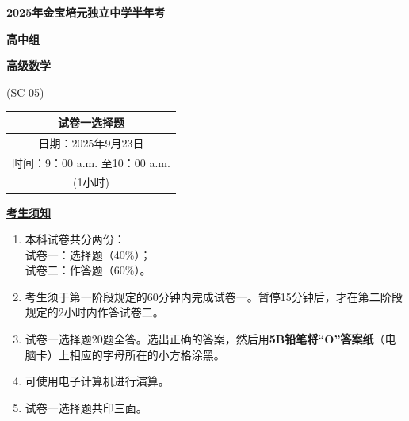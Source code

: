\documentclass[12pt,a4paper]{exam-zh}
\newcommand{\papercode}{SC 05}
\begin{document}
\thispagestyle{fancy}

\begin{minipage}[t]{0.22\linewidth}
  \vspace{0pt}
\end{minipage}
\hfill
\begin{minipage}[t]{0.56\linewidth}
  \centering
  {\bfseries 2025年金宝培元独立中学半年考\par}
  \vspace{2.3em}
  {\bfseries 高中组\par}
  \vspace{0.3em}
  {\bfseries 高级数学\par}
  \vspace{0.2em}
  {\large (\papercode)\par}
\end{minipage}
\hfill
\begin{minipage}[t]{0.18\linewidth}
  \vspace{0pt}
\end{minipage}

\vspace{3.0em}

\begin{center}
  \begin{tabular}{c}
    试卷一\hspace{2em}选择题\\[-0.1em]
    \midrule
    日期：2025年9月23日\\[-0.1em]
    时间：9：00 a.m. 至10：00 a.m.\\[-0.1em]
    (1小时)\\
    \midrule
  \end{tabular}
\end{center}

\vspace{2.0em}

{\bfseries \underline{考生须知}\par}
\vspace{0.8em}

\begin{enumerate}[label=\arabic*、,leftmargin=2em,itemsep=0.65em]
  \item 本科试卷共分两份：\\
  试卷一：选择题（40\%）；\\
  试卷二：作答题（60\%）。

  \item 考生须于第一阶段规定的60分钟内完成试卷一。暂停15分钟后，才在第二阶段规定的2小时内作答试卷二。

  \item 试卷一选择题20题全答。选出正确的答案，然后用\textbf{5B铅笔将“O”答案纸}（电脑卡）上相应的字母所在的小方格涂黑。

  \item 可使用电子计算机进行演算。

  \item 试卷一选择题共印三面。
\end{enumerate}
\end{document}
